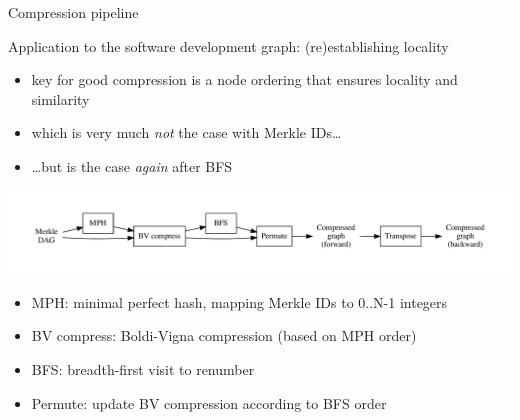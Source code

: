 \documentclass[aspectratio=169,xcolor=table]{beamer}
\begin{document}
    \begin{frame}{Compression pipeline}
        \begin{block}{Application to the software development graph: (re)establishing locality}
            \begin{itemize}
                \item key for good compression is a node ordering that ensures locality and
                    similarity
                \item which is very much \emph{not} the case with Merkle IDs\ldots{}
                \item \ldots{}but is the case \emph{again} after BFS
            \end{itemize}
        \end{block}
        \begin{center}
            \includegraphics[width=1\linewidth]{../img/compression/compression_steps-nofiles}
        \end{center}
        \vspace{-1cm}
        \begin{itemize}
            \item \alert{MPH:} minimal perfect hash, mapping Merkle IDs to 0..N-1 integers
            \item \alert{BV compress:} Boldi-Vigna compression (based on MPH order)
            \item \alert{BFS:} breadth-first visit to renumber
            \item \alert{Permute:} update BV compression according to BFS order
        \end{itemize}
    \end{frame}
\end{document}
